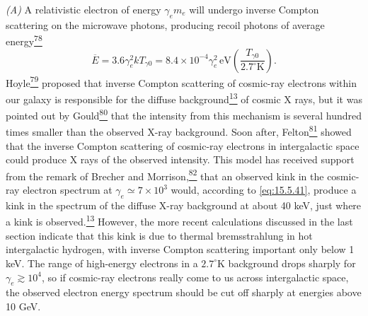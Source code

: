 \emph{(A)} A relativistic electron of energy \(\gamma_em_e\) will undergo
inverse Compton scattering on the microwave photons, producing recoil photons
of average energy\hyperref[ch15-ref-78]{\textsuperscript{78}}
\begin{equation}
  \overline E
  =
  3.6\gamma_e^2kT_{\gamma0}
  =
  8.4\times10^{-4}\gamma_e^2\,\mathrm{eV}
  \left(\frac{T_{\gamma0}}{2.7^\circ\mathrm{K}}\right).
  \tag{15.5.41}\label{eq:15.5.41}
\end{equation}
Hoyle\hyperref[ch15-ref-79]{\textsuperscript{79}} proposed that inverse
Compton scattering of cosmic-ray electrons within our galaxy is responsible
for the diffuse background\hyperref[ch15-ref-13]{\textsuperscript{13}} of
cosmic X rays, but it was pointed out by
Gould\hyperref[ch15-ref-80]{\textsuperscript{80}} that the intensity from
this mechanism is several hundred times smaller than the observed X-ray
background. Soon after, Felton\hyperref[ch15-ref-81]{\textsuperscript{81}}
showed that the inverse Compton scattering of cosmic-ray electrons in
intergalactic space could produce X rays of the observed intensity. This model
has received support from the remark of Brecher and
Morrison,\hyperref[ch15-ref-82]{\textsuperscript{82}} that an observed kink
in the cosmic-ray electron spectrum at \(\gamma_e\simeq7\times10^3\) would,
according to \eqref{eq:15.5.41}, produce a kink in the spectrum of the diffuse
X-ray background at about 40 keV, just where a kink is
observed.\hyperref[ch15-ref-13]{\textsuperscript{13}} However, the more recent
calculations discussed in the last section indicate that this kink is due to
thermal bremsstrahlung in hot intergalactic hydrogen, with inverse Compton
scattering important only below 1 keV. The range of high-energy electrons in a
\(2.7^\circ\mathrm{K}\) background drops sharply for \(\gamma_e\gtrsim10^4\),
so if cosmic-ray electrons really come to us across intergalactic space, the
observed electron energy spectrum should be cut off sharply at energies above
10 GeV.

